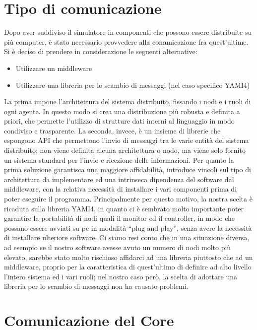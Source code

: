 \section{Tipo di comunicazione}

Dopo aver suddiviso il simulatore in componenti che possono essere distribuite su più computer, è stato necessario provvedere alla comunicazione fra quest'ultime.
Si è deciso di prendere in considerazione le seguenti alternative:
\begin{itemize}
\item Utilizzare un middleware
\item Utilizzare una libreria per lo scambio di messaggi (nel caso specifico YAMI4)
\end{itemize}
La prima impone l’architettura del sistema distribuito, fissando i nodi e i ruoli di ogni agente. In questo modo si crea una distribuzione più robusta e definita a priori, che permette l’utilizzo di strutture dati interni al linguaggio in modo condiviso e trasparente.
La seconda, invece, è un insieme di librerie che espongono API che permettono l’invio di messaggi tra le varie entità del sistema distribuito; non viene definita alcuna architettura o nodo, ma viene solo fornito un sistema standard per l’invio e ricezione delle informazioni.
Per quanto la prima soluzione garantisca una maggiore affidabilità, introduce vincoli sul tipo di architettura da implementare ed una intrinseca dipendenza del software dal middleware, con la relativa necessità di installare i vari componenti prima di poter eseguire il programma.
Principalmente per questo motivo, la nostra scelta è ricaduta sulla libreria YAMI4, in quanto ci è sembrato molto importante poter garantire la portabilità di nodi quali il monitor ed il controller, in modo che possano essere avviati su pc in modalità “plug and play”, senza avere la necessità di installare ulteriore software.
Ci siamo resi conto che in una situazione diversa, ad esempio se il nostro software avesse avuto un numero di nodi molto più elevato, sarebbe stato molto rischioso affidarci ad una libreria piuttosto che ad un middleware, proprio per la caratteristica di quest’ultimo di definire ad alto livello l’intero sistema ed i vari ruoli; nel nostro caso però, la scelta di adottare una libreria per lo scambio di messaggi non ha causato problemi.


\section{Comunicazione del Core}

